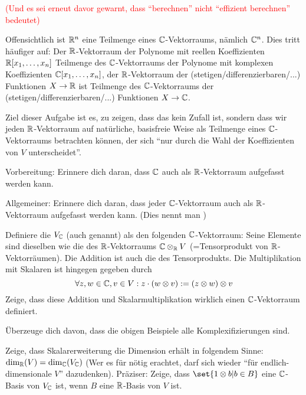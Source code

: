 \begin{sheet}
\begin{problem}[title={Wilde Behauptungen}, difficulty={schwer}]
\medbreak
\textcolor{red}{(Und es sei erneut davor gewarnt, dass \enquote{berechnen} nicht \enquote{effizient berechnen} bedeutet)}
\end{problem}


\begin{problem}[title={Komplexifizierung}]
Offensichtlich ist $\mathbb{R}^n$ eine Teilmenge eines $\mathbb{C}$-Vektorraums, nämlich $\mathbb{C}^n$. Dies tritt häufiger auf: Der $\mathbb{R}$-Vektorraum der Polynome mit reellen Koeffizienten $\mathbb{R}[x_1,\ldots,x_n]$ Teilmenge des $\mathbb{C}$-Vektorraums der Polynome mit komplexen Koeffizienten $\mathbb{C}[x_1,\ldots,x_n]$, der $\mathbb{R}$-Vektorraum der (stetigen/differenzierbaren/...) Funktionen $X\to\mathbb{R}$ ist Teilmenge des $\mathbb{C}$-Vektorraums der (stetigen/differenzierbaren/...) Funktionen $X\to\mathbb{C}$.

\smallbreak
Ziel dieser Aufgabe ist es, zu zeigen, dass das kein Zufall ist, sondern dass wir jeden $\mathbb{R}$-Vektorraum auf natürliche, basisfreie Weise als Teilmenge eines $\mathbb{C}$-Vektorraums betrachten können, der sich \enquote{nur durch die Wahl der Koeffizienten von $V$ unterscheidet}.

\begin{subproblem}
Vorbereitung: Erinnere dich daran, dass $\mathbb{C}$ auch als $\mathbb{R}$-Vektorraum aufgefasst werden kann.

Allgemeiner: Erinnere dich daran, dass jeder $\mathbb{C}$-Vektorraum auch als $\mathbb{R}$-Vektorraum aufgefasst werden kann. (Dies nennt man )
\end{subproblem}

\begin{subproblem}
Definiere die  $V_{\mathbb{C}}$ (auch  genannt) als den folgenden $\mathbb{C}$-Vektorraum: Seine Elemente sind dieselben wie die des $\mathbb{R}$-Vektorraums $\mathbb{C}\otimes_{\mathbb{R}} V$ (=Tensorprodukt von $\mathbb{R}$-Vektorräumen). Die Addition ist auch die des Tensorprodukts. Die Multiplikation mit Skalaren ist hingegen gegeben durch
\[\forall z,w\in\mathbb{C}, v\in V: z\cdot(w\otimes v) := (z\otimes w)\otimes v\]
Zeige, dass diese Addition und Skalarmultiplikation wirklich einen $\mathbb{C}$-Vektorraum definiert.
\end{subproblem}

\begin{subproblem}
Überzeuge dich davon, dass die obigen Beispiele alle Komplexifizierungen sind.
\end{subproblem}

\begin{subproblem}
Zeige, dass Skalarerweiterung die Dimension erhält in folgendem Sinne: $\dim_{\mathbb{R}}(V) = \dim_{\mathbb{C}}(V_{\mathbb{C}})$ (Wer es für nötig erachtet, darf sich wieder \enquote{für endlich-dimensionale $V$} dazudenken). Präziser: Zeige, dass $\set{1\otimes b | b\in B}$ eine $\mathbb{C}$-Basis von $V_{\mathbb{C}}$ ist, wenn $B$ eine $\mathbb{R}$-Basis von $V$ ist.
\end{subproblem}


\end{problem}
\end{sheet}
